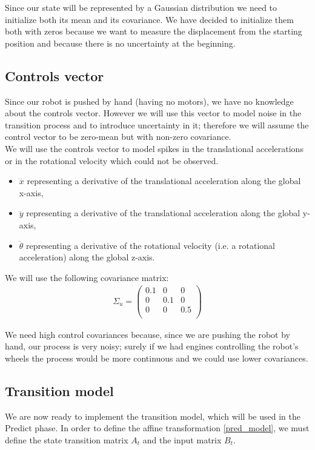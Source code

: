 Since our state will be represented by a Gaussian distribution we need to initialize both its mean and its covariance. We have decided to initialize them both with zeros because we want to measure the displacement from the starting position and because there is no uncertainty at the beginning.

\subsection{Controls vector}\label{controls}
Since our robot is pushed by hand (having no motors), we have no knowledge about the controls vector. However we will use this vector to model noise in the transition process and to introduce uncertainty in it; therefore we will assume the control vector to be zero-mean but with non-zero covariance.\\

We will use the controls vector to model spikes in the translational accelerations or in the rotational velocity which could not be observed.
\begin{itemize}
	\item $\dddot{x}$ representing a derivative of the translational acceleration along the global x-axis,
	\item $\dddot{y}$ representing a derivative of the translational acceleration along the global y-axis,
	\item $\ddot{\theta}$ representing a derivative of the rotational velocity (i.e. a rotational acceleration) along the global z-axis.
\end{itemize}

We will use the following covariance matrix:
\begin{align}
	\Sigma_u = \begin{pmatrix}
				0.1 & 0 & 0\\
				0 & 0.1 & 0\\
				0 & 0 & 0.5\\
			\end{pmatrix}
\end{align}

We need high control covariances because, since we are pushing the robot by hand, our process is very noisy; surely if we had engines controlling the robot's wheels the process would be more continuous and we could use lower covariances.

\subsection{Transition model}
We are now ready to implement the transition model, which will be used in the Predict phase. In order to define the affine transformation \ref{pred_model}, we must define the state transition matrix $A_t$ and the input matrix $B_t$.\\

